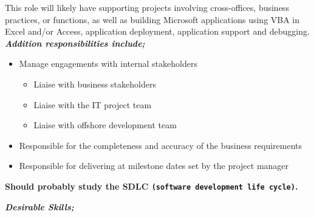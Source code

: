 \documentclass{article}
\begin{document}
This role will likely have supporting projects involving cross-offices, business practices, or functions, as well as building Microsoft applications using VBA in Excel and/or Access, application deployment, application support and debugging. \\

\hspace{-0.67cm} \textbf{\textit{Addition responsibilities include;}}

\begin{itemize}
    \item Manage engagements with internal stakeholders
    \begin{itemize}
        \item Liaise with business stakeholders
        \item Liaise with the IT project team
        \item Liaise with offshore development team
    \end{itemize}
    \item Responsible for the completeness and accuracy of the business requirements 
    \item Responsible for delivering at milestone dates set by the project manager
\end{itemize}

\textbf{Should probably study the SDLC \texttt{(software development life cycle)}.} \\

\vspace{0.7cm}

\textbf{\textit{Desirable Skills;}}
\end{document}
